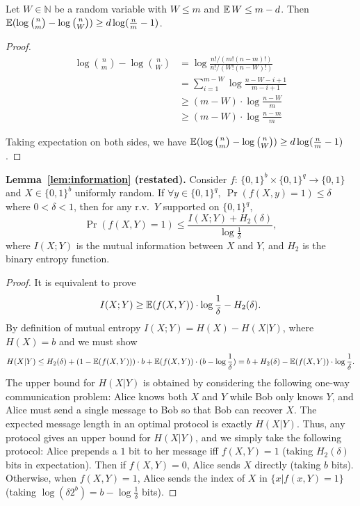 \begin{lemma} \label{lemma:bits-saving}
Let $W\in \mathbb{N}$ be a random variable with $W\le m$ and $\operatorname*{\mathbb{E}} W\le m-d$. Then $\operatorname*{\mathbb{E}}(\log {n \choose m}-\log {n \choose W})\ge d \log (\frac{n}{m}-1)$.
\end{lemma}

\begin{proof}
  \begin{align*}
  \log {n \choose m}-\log {n \choose W}
  &= \log \frac{n!/(m!(n-m)!)}{n!/(W!(n-W)!)} \\
  &= \sum_{i=1}^{m-W}\log \frac{n-W-i+1}{m-i+1} \\
  &\ge (m-W)\cdot \log \frac{n-W}{m} \\
  &\ge (m-W)\cdot \log \frac{n-m}{m}
  \end{align*}
  
  Taking expectation on both sides, we have $\operatorname*{\mathbb{E}}(\log {n \choose m}-\log {n \choose W})\ge d \log (\frac{n}{m}-1)$. 
\end{proof}

\noindent \textbf{Lemma~\ref{lem:information} (restated).}
  Consider $f$: $\{0,1\}^b\times \{0,1\}^q\rightarrow \{0,1\}$ and $X\in\{0,1\}^b$ uniformly random. If $\forall y\in \{0,1\}^q,\ \Pr(f(X,y)=1)\le \delta$ where $0<\delta<1$, then for any r.v.\ $Y$ supported on $\{0,1\}^q$,
$$
  \Pr(f(X,Y)=1)\le \frac{I(X;Y)+H_2(\delta)}{\log \frac{1}{\delta}} ,
$$
  where $I(X;Y)$ is the mutual information between $X$ and $Y$, and $H_2$ is the binary entropy function.
\begin{proof}
  It is equivalent to prove 
$$I(X;Y)\ge \operatorname*{\mathbb{E}}(f(X,Y))\cdot \log\frac{1}{\delta}-H_2(\delta).$$
By definition of mutual entropy $I(X;Y)=H(X)-H(X|Y)$, where $H(X)=b$ and we must show
\begin{equation}
H(X|Y)\le H_2(\delta)+(1-\operatorname*{\mathbb{E}}(f(X,Y)))\cdot b+\operatorname*{\mathbb{E}}(f(X,Y))\cdot (b-\log\frac{1}{\delta}) = b+H_2(\delta)-\operatorname*{\mathbb{E}}(f(X,Y))\cdot \log\frac{1}{\delta}.
\end{equation}
  The upper bound for $H(X|Y)$ is obtained by considering the following one-way communication problem: Alice knows both $X$ and $Y$ while Bob only knows $Y$, and Alice must send a single message to Bob so that Bob can recover $X$. The expected message length in an optimal protocol is exactly $H(X|Y)$.  Thus, any protocol gives an upper bound for $H(X|Y)$, and we simply take the following protocol: Alice prepends a $1$ bit to her message iff $f(X,Y) = 1$ (taking $H_2(\delta)$ bits in expectation). Then if $f(X,Y)=0$, Alice sends $X$ directly (taking $b$ bits). Otherwise, when $f(X,Y)=1$, Alice sends the index of $X$ in $\{x|f(x,Y)=1\}$ (taking $\log (\delta 2^b)=b-\log\frac{1}{\delta}$ bits).  
\end{proof}


